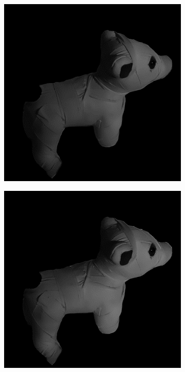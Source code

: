 \documentclass[11pt]{article}
\begin{document}
\begin{figure}[!hbt]
\centering
  \vspace{-5pt}
  \begin{subfigure}[h]{0.3\textwidth}
    \centering
    \includegraphics[width = \textwidth]{../dog-png/dog1.png}
  \end{subfigure} 
    \begin{subfigure}[h]{0.3\textwidth}
    \centering
    \includegraphics[width = \textwidth]{../dog-png/dog2.png}

\end{subfigure}
\end{figure}
\end{document}
